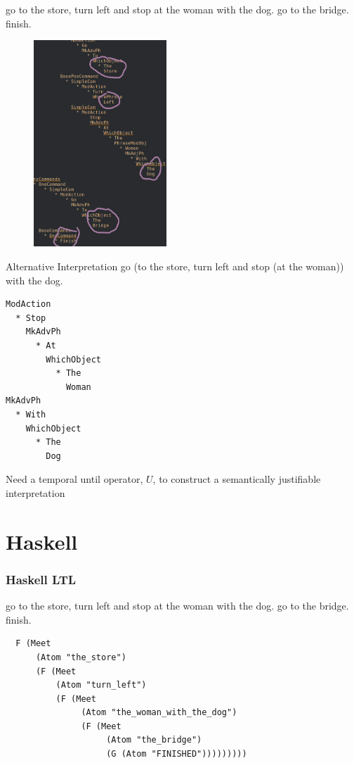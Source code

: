 \documentclass{beamer}
\begin{document}
\begin{frame}
\fontsize{9pt}{10pt}\selectfont
\begin{exampleblock}{}
go to the store, turn left and stop at the woman with the dog. go to the bridge.
finish.
\end{exampleblock}

\begin{figure}

\centering
\includegraphics[width=50mm]{pics/circledZoom.png}
\end{figure}
\end{frame}


\begin{frame}[fragile]
\begin{exampleblock}{Alternative Interpretation}
go (to the store, turn left and stop (at the woman)) with the dog. 
\end{exampleblock}
\pause
\begin{verbatim}
ModAction
  * Stop
    MkAdvPh
      * At
        WhichObject
          * The
            Woman
MkAdvPh
  * With
    WhichObject
      * The
        Dog
\end{verbatim}
\pause
\begin{alertblock}{}
Need a temporal until operator, $U$, to construct a semantically justifiable interpretation
\end{alertblock}
\end{frame}

\section{Haskell}

\begin{frame}[fragile]
\frametitle{Haskell LTL}

\fontsize{9pt}{10pt}\selectfont
\begin{exampleblock}{}
go to the store, turn left and stop at the woman with the dog. go to the bridge.
finish.
\end{exampleblock}

\begin{verbatim}
  F (Meet
      (Atom "the_store")
      (F (Meet
          (Atom "turn_left")
          (F (Meet
               (Atom "the_woman_with_the_dog")
               (F (Meet
                    (Atom "the_bridge")
                    (G (Atom "FINISHED")))))))))
\end{verbatim}
\end{frame}
\end{document}
